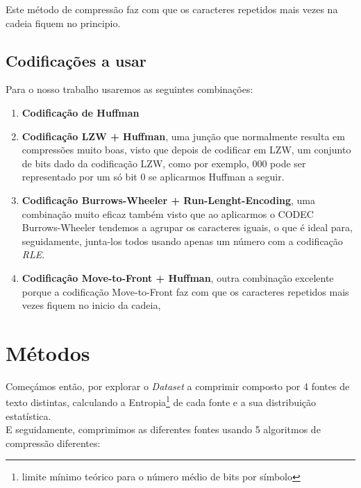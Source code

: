 \documentclass[11pt,journal,compsoc]{IEEEtran}
\begin{document}
Este método de compressão faz com que os caracteres repetidos mais vezes na cadeia fiquem no principio.


\subsection{Codificações a usar}
Para o nosso trabalho usaremos as seguintes combinações:
\begin{enumerate}
    \item \textbf{Codificação de Huffman}
    \item \textbf{Codificação LZW + Huffman}, uma junção que normalmente resulta em compressões muito boas, visto que depois de codificar em LZW, um conjunto de bits dado da codificação LZW, como por exemplo, 000 pode ser representado por um só bit 0 se aplicarmos Huffman a seguir.
    \item \textbf{Codificação Burrows-Wheeler + Run-Lenght-Encoding}, uma combinação muito eficaz também visto que ao aplicarmos o CODEC Burrows-Wheeler tendemos a agrupar os caracteres iguais, o que é ideal para, seguidamente, junta-los todos usando apenas um número com a codificação \textit{RLE}.
    
    \item \textbf{Codificação Move-to-Front + Huffman}, outra combinação excelente porque a codificação Move-to-Front faz com que os caracteres repetidos mais vezes fiquem no inicio da cadeia, %
\end{enumerate}


\section{Métodos}\label{sec:metodos}
Começámos então, por explorar o \textit{Dataset} a comprimir composto por 4 fontes de texto distintas, calculando a Entropia\footnote{limite mínimo teórico para o número médio de bits por símbolo} de cada fonte e a sua distribuição estatística.\\
E seguidamente, comprimimos as diferentes fontes usando 5 algoritmos de compressão diferentes:
\end{document}

